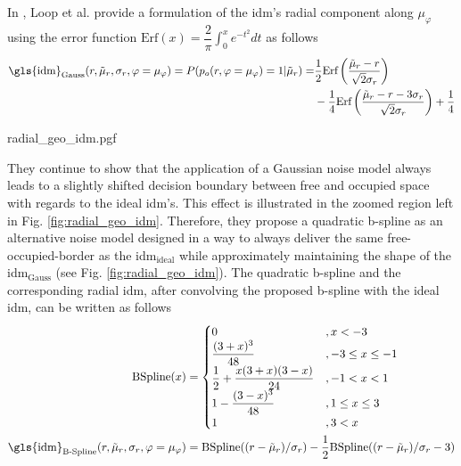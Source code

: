 In \cite{loop2016closed}, Loop et al. provide a formulation of the \gls{idm}'s radial component along $\mu_\varphi$ using the error function $\text{Erf}(x) = \dfrac{2}{\pi} \int_{0}^{x}e^{-t^2}dt$ as follows 
\begin{align}
	\label{eq:gauss_idm}
	\text{\gls{idm}}_{\text{Gauss}}(r,\tilde{\mu}_r, \sigma_r, \varphi = \mu_\varphi) = P(p_o(r, \varphi = \mu_\varphi) = 1 |\tilde{\mu}_r)  =& \dfrac{1}{2}\text{Erf}\left(\dfrac{\tilde{\mu}_r-r}{\sqrt{2}\sigma_r}\right)\\
	&- \dfrac{1}{4}\text{Erf}\left(\dfrac{\tilde{\mu}_r - r - 3\sigma_r}{\sqrt{2}\sigma_r}\right) + \dfrac{1}{4} \notag
\end{align}
\begin{center}
	{radial_geo_idm.pgf}
\end{center}
They continue to show that the application of a Gaussian noise model always leads to a slightly shifted decision boundary between free and occupied space with regards to the ideal \gls{idm}'s. This effect is illustrated in the zoomed region left in Fig. \ref{fig:radial_geo_idm}. Therefore, they propose a quadratic b-spline as an alternative noise model designed in a way to always deliver the same free-occupied-border as the \gls{idm}$_{\text{ideal}}$ while approximately maintaining the shape of the \gls{idm}$_{\text{Gauss}}$ (see Fig. \ref{fig:radial_geo_idm}). The quadratic b-spline and the corresponding radial \gls{idm}, after convolving the proposed b-spline with the ideal \gls{idm}, can be written as follows
\begin{align}
	\label{eq:bspline}
	\text{BSpline}(x) &= 
	\begin{cases}
		0 &, x < -3\\
		\dfrac{(3+x)^3}{48} &, -3 \leq x \leq -1\\
		\dfrac{1}{2}+\dfrac{x(3+x)(3-x)}{24} &, -1 < x < 1\\
		1-\dfrac{(3-x)^3}{48} &, 1 \leq x \leq 3\\
		1 &, 3 < x\\
	\end{cases}\\
%
	\label{eq:bspline_idm}
	\text{\gls{idm}}_{\text{B-Spline}}(r,\tilde{\mu}_r, \sigma_r, \varphi = \mu_\varphi) &= \text{BSpline}((r - \tilde{\mu}_r)/\sigma_r) - \dfrac{1}{2}\text{BSpline}((r - \tilde{\mu}_r)/\sigma_r - 3)
\end{align}
